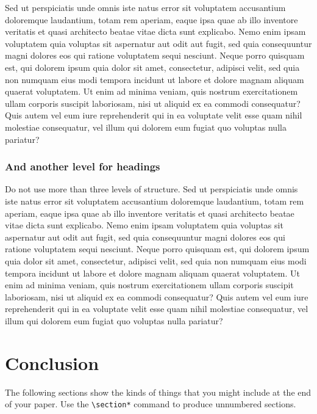 \documentclass[article, a4paper, 12pt]{memoir}
\begin{document}
Sed ut perspiciatis unde omnis iste natus error sit voluptatem accusantium doloremque laudantium, totam rem aperiam, eaque ipsa quae ab illo inventore veritatis et quasi architecto beatae vitae dicta sunt explicabo. Nemo enim ipsam voluptatem quia voluptas sit aspernatur aut odit aut fugit, sed quia consequuntur magni dolores eos qui ratione voluptatem sequi nesciunt. Neque porro quisquam est, qui dolorem ipsum quia dolor sit amet, consectetur, adipisci velit, sed quia non numquam eius modi tempora incidunt ut labore et dolore magnam aliquam quaerat voluptatem. Ut enim ad minima veniam, quis nostrum exercitationem ullam corporis suscipit laboriosam, nisi ut aliquid ex ea commodi consequatur? Quis autem vel eum iure reprehenderit qui in ea voluptate velit esse quam nihil molestiae consequatur, vel illum qui dolorem eum fugiat quo voluptas nulla pariatur?

\subsubsection{And another level for headings}
\label{sec:anoth-level-head}

Do not use more than three levels of structure. Sed ut perspiciatis unde omnis iste natus error sit voluptatem accusantium doloremque laudantium, totam rem aperiam, eaque ipsa quae ab illo inventore veritatis et quasi architecto beatae vitae dicta sunt explicabo. Nemo enim ipsam voluptatem quia voluptas sit aspernatur aut odit aut fugit, sed quia consequuntur magni dolores eos qui ratione voluptatem sequi nesciunt. Neque porro quisquam est, qui dolorem ipsum quia dolor sit amet, consectetur, adipisci velit, sed quia non numquam eius modi tempora incidunt ut labore et dolore magnam aliquam quaerat voluptatem. Ut enim ad minima veniam, quis nostrum exercitationem ullam corporis suscipit laboriosam, nisi ut aliquid ex ea commodi consequatur? Quis autem vel eum iure reprehenderit qui in ea voluptate velit esse quam nihil molestiae consequatur, vel illum qui dolorem eum fugiat quo voluptas nulla pariatur?

\section{Conclusion}
\label{sec:conclusion}

The following sections show the kinds of things that you might include at the end of your paper. Use the \texttt{\textbackslash section*} command to produce unnumbered sections.
\end{document}
